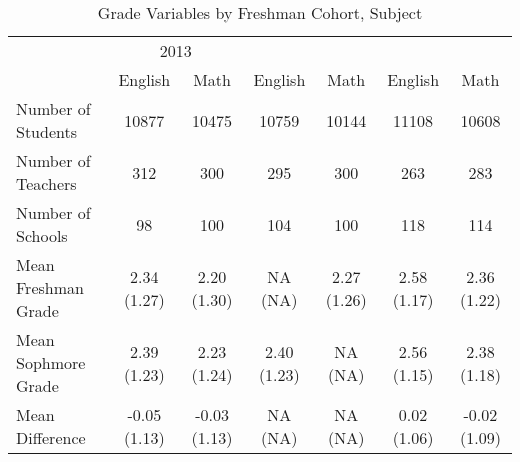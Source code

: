 \begin{table}

\caption{\label{tab:table_freq}Grade Variables by Freshman Cohort, Subject\label{tab:table_freq}}
\centering
\begin{tabular}[t]{lcccccc}
\toprule
\multicolumn{1}{c}{ } & \multicolumn{2}{c}{2013} \\
\cmidrule(l{3pt}r{3pt}){2-3}
  & English & Math & English & Math & English & Math\\
\midrule
Number of Students & 10877 & 10475 & 10759 & 10144 & 11108 & 10608\\
Number of Teachers & 312 & 300 & 295 & 300 & 263 & 283\\
Number of Schools & 98 & 100 & 104 & 100 & 118 & 114\\
\addlinespace
Mean Freshman Grade & 2.34 (1.27) & 2.20 (1.30) & NA (NA) & 2.27 (1.26) & 2.58 (1.17) & 2.36 (1.22)\\
Mean Sophmore Grade & 2.39 (1.23) & 2.23 (1.24) & 2.40 (1.23) & NA (NA) & 2.56 (1.15) & 2.38 (1.18)\\
Mean Difference & -0.05 (1.13) & -0.03 (1.13) & NA (NA) & NA (NA) & 0.02 (1.06) & -0.02 (1.09)\\
\bottomrule
\end{tabular}
\end{table}
